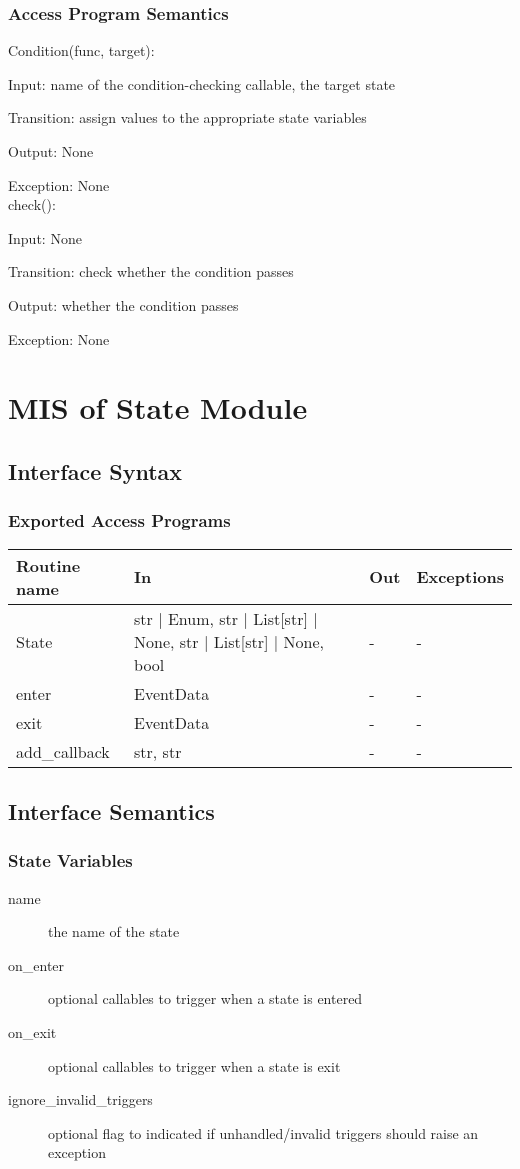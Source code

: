 \documentclass[12pt,titlepage]{article}
\begin{document}
\subsubsection{Access Program Semantics}

Condition(func, target):

Input: name of the condition-checking callable, the target state

Transition: assign values to the appropriate state variables

Output: None

Exception: None \\
check():

Input: None

Transition: check whether the condition passes

Output: whether the condition passes

Exception: None \\

\newpage
\section{MIS of State Module}

\subsection{Interface Syntax}
\subsubsection{Exported Access Programs}
\begin{tabular}{| l | l | l | l |}
  \hline
  \textbf{Routine name} & \textbf{In} & \textbf{Out} & \textbf{Exceptions}\\
  \hline
  State & str | Enum, str | List[str] | None, str | List[str] | None, bool & - & - \\
  enter & EventData & - & - \\
  exit & EventData & - & - \\
  add\_callback & str, str & - & - \\
  \hline
\end{tabular}

\subsection{Interface Semantics}
\subsubsection{State Variables}
\begin{description}
\item[name] the name of the state
\item[on\_enter] optional callables to trigger when a state is entered
\item[on\_exit] optional callables to trigger when a state is exit
\item[ignore\_invalid\_triggers] optional flag to indicated if unhandled/invalid
  triggers should raise an exception
\end{description}
\end{document}
